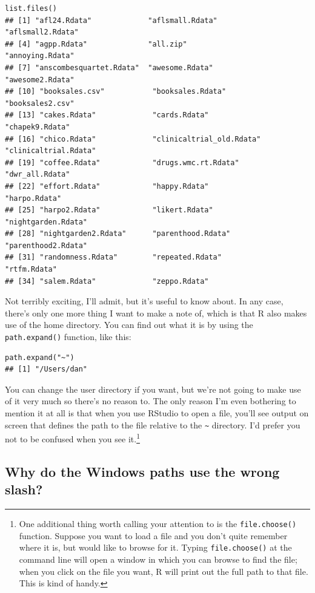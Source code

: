 \documentclass[
]{book}
\begin{document}
\begin{verbatim}
list.files()
## [1] "afl24.Rdata"             "aflsmall.Rdata"          "aflsmall2.Rdata"        
## [4] "agpp.Rdata"              "all.zip"                 "annoying.Rdata"         
## [7] "anscombesquartet.Rdata"  "awesome.Rdata"           "awesome2.Rdata"         
## [10] "booksales.csv"           "booksales.Rdata"         "booksales2.csv"         
## [13] "cakes.Rdata"             "cards.Rdata"             "chapek9.Rdata"          
## [16] "chico.Rdata"             "clinicaltrial_old.Rdata" "clinicaltrial.Rdata"    
## [19] "coffee.Rdata"            "drugs.wmc.rt.Rdata"      "dwr_all.Rdata"          
## [22] "effort.Rdata"            "happy.Rdata"             "harpo.Rdata"            
## [25] "harpo2.Rdata"            "likert.Rdata"            "nightgarden.Rdata"      
## [28] "nightgarden2.Rdata"      "parenthood.Rdata"        "parenthood2.Rdata"      
## [31] "randomness.Rdata"        "repeated.Rdata"          "rtfm.Rdata"             
## [34] "salem.Rdata"             "zeppo.Rdata"
\end{verbatim}

Not terribly exciting, I'll admit, but it's useful to know about. In any case, there's only one more thing I want to make a note of, which is that R also makes use of the home directory. You can find out what it is by using the \texttt{path.expand()} function, like this:

\begin{verbatim}
path.expand("~")
## [1] "/Users/dan"
\end{verbatim}

You can change the user directory if you want, but we're not going to make use of it very much so there's no reason to. The only reason I'm even bothering to mention it at all is that when you use RStudio to open a file, you'll see output on screen that defines the path to the file relative to the \texttt{\textasciitilde{}} directory. I'd prefer you not to be confused when you see it.\footnote{One additional thing worth calling your attention to is the \texttt{file.choose()} function. Suppose you want to load a file and you don't quite remember where it is, but would like to browse for it. Typing \texttt{file.choose()} at the command line will open a window in which you can browse to find the file; when you click on the file you want, R will print out the full path to that file. This is kind of handy.}

\hypertarget{why-do-the-windows-paths-use-the-wrong-slash}{%
\subsection{Why do the Windows paths use the wrong slash?}\label{why-do-the-windows-paths-use-the-wrong-slash}}
\end{document}
